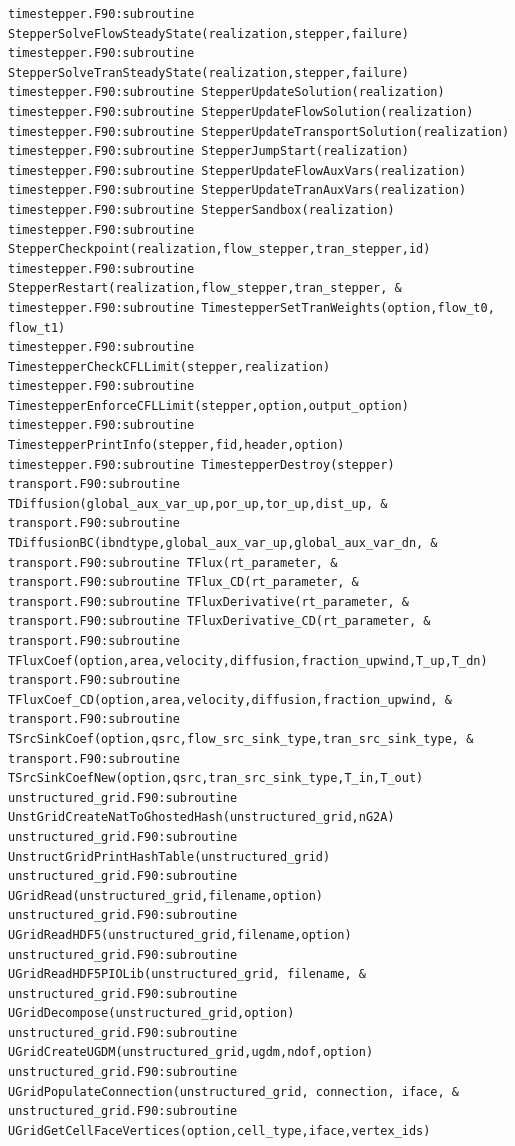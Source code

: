 \documentclass[12pt]{article}
\begin{document}
\begin{verbatim}
timestepper.F90:subroutine StepperSolveFlowSteadyState(realization,stepper,failure)
timestepper.F90:subroutine StepperSolveTranSteadyState(realization,stepper,failure)
timestepper.F90:subroutine StepperUpdateSolution(realization)
timestepper.F90:subroutine StepperUpdateFlowSolution(realization)
timestepper.F90:subroutine StepperUpdateTransportSolution(realization)
timestepper.F90:subroutine StepperJumpStart(realization)
timestepper.F90:subroutine StepperUpdateFlowAuxVars(realization)
timestepper.F90:subroutine StepperUpdateTranAuxVars(realization)
timestepper.F90:subroutine StepperSandbox(realization)
timestepper.F90:subroutine StepperCheckpoint(realization,flow_stepper,tran_stepper,id)
timestepper.F90:subroutine StepperRestart(realization,flow_stepper,tran_stepper, &
timestepper.F90:subroutine TimestepperSetTranWeights(option,flow_t0, flow_t1)
timestepper.F90:subroutine TimestepperCheckCFLLimit(stepper,realization)
timestepper.F90:subroutine TimestepperEnforceCFLLimit(stepper,option,output_option)
timestepper.F90:subroutine TimestepperPrintInfo(stepper,fid,header,option)
timestepper.F90:subroutine TimestepperDestroy(stepper)
transport.F90:subroutine TDiffusion(global_aux_var_up,por_up,tor_up,dist_up, &
transport.F90:subroutine TDiffusionBC(ibndtype,global_aux_var_up,global_aux_var_dn, &
transport.F90:subroutine TFlux(rt_parameter, &
transport.F90:subroutine TFlux_CD(rt_parameter, &
transport.F90:subroutine TFluxDerivative(rt_parameter, &
transport.F90:subroutine TFluxDerivative_CD(rt_parameter, &
transport.F90:subroutine TFluxCoef(option,area,velocity,diffusion,fraction_upwind,T_up,T_dn)
transport.F90:subroutine TFluxCoef_CD(option,area,velocity,diffusion,fraction_upwind, &
transport.F90:subroutine TSrcSinkCoef(option,qsrc,flow_src_sink_type,tran_src_sink_type, &
transport.F90:subroutine TSrcSinkCoefNew(option,qsrc,tran_src_sink_type,T_in,T_out)
unstructured_grid.F90:subroutine UnstGridCreateNatToGhostedHash(unstructured_grid,nG2A)
unstructured_grid.F90:subroutine UnstructGridPrintHashTable(unstructured_grid)
unstructured_grid.F90:subroutine UGridRead(unstructured_grid,filename,option)
unstructured_grid.F90:subroutine UGridReadHDF5(unstructured_grid,filename,option)
unstructured_grid.F90:subroutine UGridReadHDF5PIOLib(unstructured_grid, filename, &
unstructured_grid.F90:subroutine UGridDecompose(unstructured_grid,option)
unstructured_grid.F90:subroutine UGridCreateUGDM(unstructured_grid,ugdm,ndof,option)
unstructured_grid.F90:subroutine UGridPopulateConnection(unstructured_grid, connection, iface, &
unstructured_grid.F90:subroutine UGridGetCellFaceVertices(option,cell_type,iface,vertex_ids)

\end{verbatim}
\end{document}
